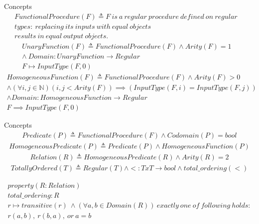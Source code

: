 \documentclass[10pt]{beamer}
\begin{document}
\begin{frame}{Concepts}
    \begin{align*}
        FunctionalProcedure(F) \triangleq F~is~a~regular~procedure~defined~on~regular~&\\
        types:~replacing~its~inputs~with~equal~objects~\\
        results~in~equal~output~objects.
    \end{align*}
    \begin{align*}
        UnaryFunction(F) \triangleq FunctionalProcedure(F) \land Arity(F) = 1 &\\
                \land~Domain: UnaryFunction \rightarrow Regular &\\
                F \mapsto InputType(F, 0)
    \end{align*}
    \begin{align*}
        HomogeneousFunction(F) \triangleq FunctionalProcedure(F) \land Arity(F) > 0\\
        \land (\forall i,j \in \mathbb{N})(i,j < Arity(F)) \implies (InputType(F, i) = InputType(F, j))\\
        \land Domain: HomogeneousFunction \rightarrow Regular\\
        F \implies InputType(F, 0)
    \end{align*}
\end{frame}

\begin{frame}{Concepts}
    \begin{align*}
        Predicate(P) \triangleq FunctionalProcedure(F) \land Codomain(P) = bool
    \end{align*}
    \begin{align*}
        HomogeneousPredicate(P) \triangleq Predicate(P) \land HomogeneousFunction(P)
    \end{align*}
    \begin{align*}
        Relation(R) \triangleq HomogeneousPredicate(R) \land Arity(R) = 2
    \end{align*}
    \begin{align*}
        TotallyOrdered(T) \triangleq Regular(T) \land <: T x T \rightarrow bool \land total\_ordering(<)
    \end{align*}
\end{frame}
\begin{frame}{}
    \begin{align*}
        property(R: Relation)\\
        total\_ordering: R \\
                r \mapsto transitive(r)~\land(\forall a,b \in Domain(R))~exactly~one~of~following~holds:\\
            r(a, b),~r(b, a),~or~a = b\\
    \end{align*}
\end{frame}
\end{document}
